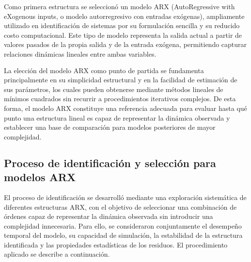 \documentclass[11pt]{report}
\begin{document}
Como primera estructura se seleccionó un modelo ARX (AutoRegressive with eXogenous inputs, o modelo autorregresivo con entradas exógenas), ampliamente utilizado en identificación de sistemas por su formulación sencilla y su reducido costo computacional. Este tipo de modelo representa la salida actual a partir de valores pasados de la propia salida y de la entrada exógena, permitiendo capturar relaciones dinámicas lineales entre ambas variables.

La elección del modelo ARX como punto de partida se fundamenta principalmente en su simplicidad estructural y en la facilidad de estimación de sus parámetros, los cuales pueden obtenerse mediante métodos lineales de mínimos cuadrados sin recurrir a procedimientos iterativos complejos. De esta forma, el modelo ARX constituye una referencia adecuada para evaluar hasta qué punto una estructura lineal es capaz de representar la dinámica observada y establecer una base de comparación para modelos posteriores de mayor complejidad.




\subsection{Proceso de identificación y selección para modelos ARX}


El proceso de identificación se desarrolló mediante una exploración sistemática de diferentes estructuras ARX, con el objetivo de seleccionar una combinación de órdenes capaz de representar la dinámica observada sin introducir una complejidad innecesaria. Para ello, se consideraron conjuntamente el desempeño temporal del modelo, su capacidad de simulación, la estabilidad de la estructura identificada y las propiedades estadísticas de los residuos. El procedimiento aplicado se describe a continuación.
\end{document}
